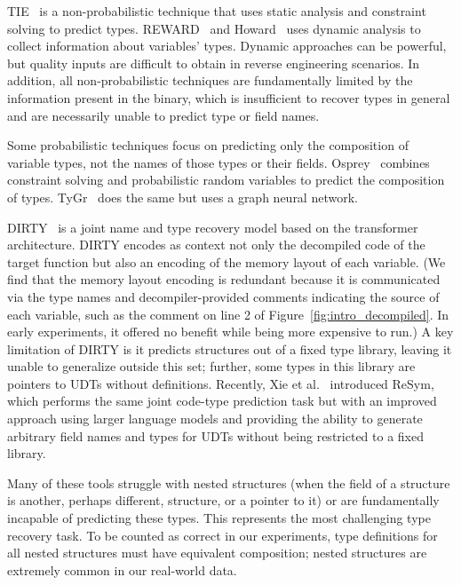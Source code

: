 TIE~\cite{tie} is a non-probabilistic technique that uses static analysis and constraint solving to predict types.
REWARD~\cite{reward} and Howard~\cite{howard} uses dynamic analysis to collect information about variables' types.
Dynamic approaches can be powerful, but quality inputs are difficult to obtain in reverse engineering scenarios.
In addition, all non-probabilistic techniques are fundamentally limited by the information present in the binary, which is insufficient to recover types in general and are necessarily unable to predict type or field names.

Some probabilistic techniques focus on predicting only the composition of variable types, not the names of those types or their fields.
Osprey~\cite{osprey} combines constraint solving and probabilistic random variables to predict the composition of types.
TyGr~\cite{tygr} does the same but uses a graph neural network.

DIRTY~\cite{dirty} is a joint name and type recovery model based on the transformer architecture.
DIRTY encodes as context not only the decompiled code of the target function but also an encoding of the memory layout of each variable.
(We find that the memory layout encoding is redundant because it is communicated via the type names and decompiler-provided comments indicating the source of each variable, such as the  comment on line 2 of Figure~\ref{fig:intro_decompiled}. In early experiments, it offered no benefit while being more expensive to run.)
A key limitation of DIRTY is it predicts structures out of a fixed type library, leaving it unable to generalize outside this set; further, some types in this library are pointers to UDTs without definitions.
Recently, Xie et al.~\cite{resym} introduced ReSym, which performs the same joint code-type prediction task but with an improved approach using larger language models and providing the ability to generate arbitrary field names and types for UDTs without being restricted to a fixed library.

Many of these tools struggle with nested structures (when the field of a structure is another, perhaps different, structure, or a pointer to it) or are fundamentally incapable of predicting these types.
This represents the most challenging type recovery task.
To be counted as correct in our experiments, type definitions for all nested structures must have equivalent composition; nested structures are extremely common in our real-world data.